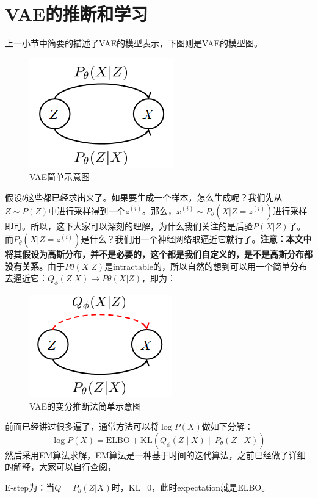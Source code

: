\documentclass[a4paper]{article}
\begin{document}
\section{VAE的推断和学习}
上一小节中简要的描述了VAE的模型表示，下图则是VAE的模型图。
\begin{figure}[H]
    \centering
    \includegraphics[width=.25\textwidth]{微信图片_20200627160913.png}
    \caption{VAE简单示意图}
    \label{fig:my_label_1}
\end{figure}
假设$\theta$这些都已经求出来了。如果要生成一个样本，怎么生成呢？我们先从$Z\sim P(Z)$中进行采样得到一个$z^{(i)}$。那么，$x^{(i)}\sim P_\theta(X|Z=z^{(i)})$进行采样即可。所以，这下大家可以深刻的理解，为什么我们关注的是后验$P(X|Z)$了。而$P_\theta(X|Z=z^{(i)})$是什么？我们用一个神经网络取逼近它就行了。\textbf{注意：本文中将其假设为高斯分布，并不是必要的，这个都是我们自定义的，是不是高斯分布都没有关系。}由于$P\theta(X|Z)$是intractable的，所以自然的想到可以用一个简单分布去逼近它：$Q_\phi(Z|X) \to P\theta(X|Z)$，即为：
\begin{figure}[H]
    \centering
    \includegraphics[width=.25\textwidth]{微信图片_20200627163051.png}
    \caption{VAE的变分推断法简单示意图}
    \label{fig:my_label_1}
\end{figure}
前面已经讲过很多遍了，通常方法可以将$\log P(X)$做如下分解：
\begin{equation}
    \log P(X)=\text{ELBO}+\text{KL}\left(Q_{\phi}(Z \mid X) \| P_{\theta}(Z \mid X)\right)
\end{equation}
然后采用EM算法求解，EM算法是一种基于时间的迭代算法，之前已经做了详细的解释，大家可以自行查阅，

E-step为：当$Q=P_\theta(Z|X)$时，KL=0，此时expectation就是ELBO。
\end{document}
